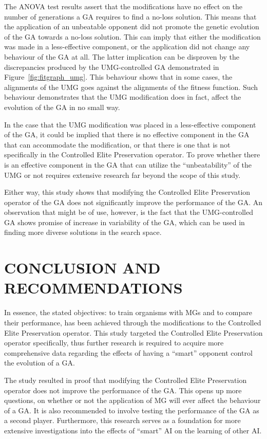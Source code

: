 \documentclass{strrespaper-trad}
\begin{document}
		The ANOVA test results assert that the modifications have no effect on the number of generations a GA requires to find a no-loss solution.
		This means that the application of an unbeatable opponent did not promote the genetic evolution of the GA towards a no-loss solution.
		This can imply that either the modification was made in a less-effective component, or the application did not change any behaviour of the GA at all.
		The latter implication can be disproven by the discrepancies produced by the UMG-controlled GA demonstrated in Figure~\ref{fig:fitgraph_umg}.
		This behaviour shows that in some cases, the alignments of the UMG goes against the alignments of the fitness function.
		Such behaviour demonstrates that the UMG modification does in fact, affect the evolution of the GA in no small way.

		In the case that the UMG modification was placed in a less-effective component of the GA, it could be implied that there is no effective component in the GA that can accommodate the modification, or that there is one that is not specifically in the Controlled Elite Preservation operator.
		To prove whether there is an effective component in the GA that can utilize the \enquote{unbeatability} of the UMG or not requires extensive research far beyond the scope of this study.

		Either way, this study shows that modifying the Controlled Elite Preservation operator of the GA does not significantly improve the performance of the GA.
		An observation that might be of use, however, is the fact that the UMG-controlled GA shows promise of increase in variability of the GA, which can be used in finding more diverse solutions in the search space.

	\chapter{CONCLUSION AND RECOMMENDATIONS}
		In essence, the stated objectives: to train organisms with MGs and to compare their performance, has been achieved through the modifications to the Controlled Elite Preservation operator.
		This study targeted the Controlled Elite Preservation operator specifically, thus further research is required to acquire more comprehensive data regarding the effects of having a \enquote{smart} opponent control the evolution of a GA.
		
		The study resulted in proof that modifying the Controlled Elite Preservation operator does not improve the performance of the GA.
		This opens up more questions, on whether or not the application of MG will ever affect the behaviour of a GA.
		It is also recommended to involve testing the performance of the GA as a second player.
		Furthermore, this research serves as a foundation for more extensive investigations into the effects of \enquote{smart} AI on the learning of other AI.
\end{document}
